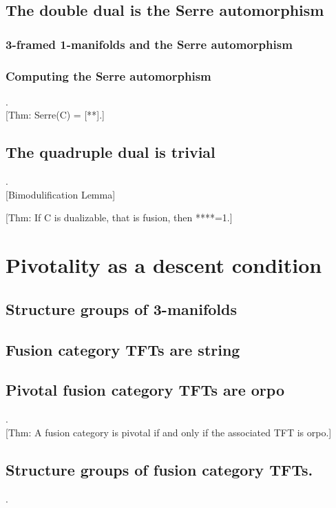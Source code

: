 \documentclass{amsart}
\begin{document}
\subsection{The double dual is the Serre automorphism}

\subsubsection{3-framed 1-manifolds and the Serre automorphism}

\subsubsection{Computing the Serre automorphism} .\\

	[Thm: Serre(C) = [**].]

\subsection{The quadruple dual is trivial} .\\

	[Bimodulification Lemma]
	
	[Thm: If C is dualizable, that is fusion, then ****=1.]

\section{Pivotality as a descent condition}

\subsection{Structure groups of 3-manifolds}

\subsection{Fusion category TFTs are string}

\subsection{Pivotal fusion category TFTs are orpo} .\\

	[Thm: A fusion category is pivotal if and only if the associated TFT is orpo.]

\subsection{Structure groups of fusion category TFTs.} .\\
\end{document}
